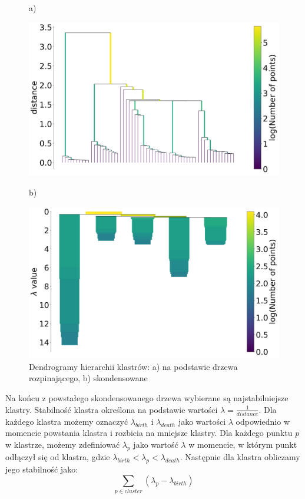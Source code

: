 	\begin{figure}[htb]
		\centering
		\begin{minipage}{.5\textwidth}
			a)\par\medskip %
			\begin{flushleft}
				\includegraphics[width=.95\linewidth]{rys04/hdbscan_slt.png}
			\end{flushleft}
		\end{minipage}%
		\begin{minipage}{.5\textwidth}
			b)\par\medskip %
			\begin{flushright}
				\includegraphics[width=.95\linewidth]{rys04/hdbscan_ct.png}
			\end{flushright}
		\end{minipage}
		\caption[Dendrogramy hierarchii klastrów]{Dendrogramy hierarchii klastrów: a) na podstawie drzewa rozpinającego, b) skondensowane}\label{fig:dendrogram} %
	\end{figure}

	Na końcu z powstałego skondensowanego drzewa wybierane są najstabilniejsze klastry.
	Stabilność klastra określona na podstawie wartości \(\lambda=\frac{1}{distance}\).
	Dla każdego klastra możemy oznaczyć \(\lambda_{birth}\) i \(\lambda_{death}\) jako wartości \(\lambda\)
		odpowiednio w momencie powstania klastra i rozbicia na mniejsze klastry.
	Dla każdego punktu \(p\) w klastrze, możemy zdefiniować \(\lambda_p\)
		jako wartość \(\lambda\) w momencie, w którym punkt odłączył się od klastra, gdzie \(\lambda_{birth} < \lambda_p < \lambda_{death}\).
	Następnie dla klastra obliczamy jego stabilność jako:
	\[ \sum_{p\in cluster}\left(\lambda_p - \lambda_{birth}\right) \]

